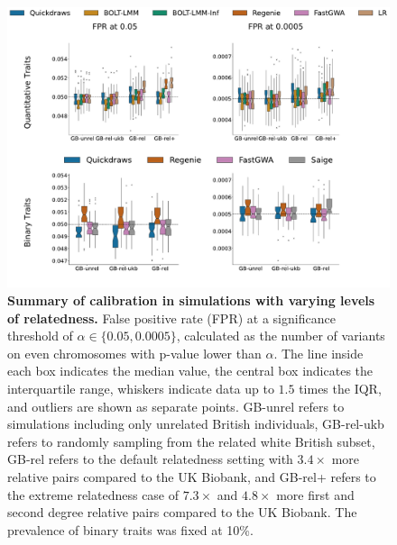 \newpage

\begin{figure}[h!]
    \centering
    \includegraphics[width=\textwidth]{figures/sim_calibration/relatedness_fpr.pdf}
    \caption{\textbf{Summary of calibration in simulations with varying levels of relatedness.}
    False positive rate (FPR) at a significance threshold of $\alpha \in \{0.05, 0.0005\}$, calculated as the number of variants on even chromosomes with p-value lower than $\alpha$.
    The line inside each box indicates the median value, the central box indicates the interquartile range, whiskers indicate data up to $1.5$ times the IQR, and outliers are shown as separate points.
    GB-unrel refers to simulations including only unrelated British individuals, GB-rel-ukb refers to randomly sampling from the related white British subset, GB-rel refers to the default relatedness setting with $3.4 \times$ more relative pairs compared to the UK Biobank, and GB-rel+ refers to the extreme relatedness case of $7.3 \times$ and $4.8 \times$ more first and second degree relative pairs compared to the UK Biobank.
    The prevalence of binary traits was fixed at 10\%.
    }
    \label{fig:sim_calib_rel}
\end{figure}


